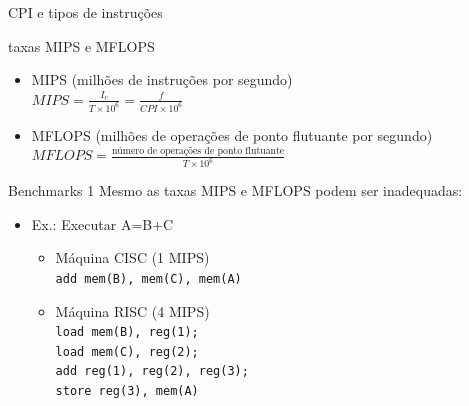 \begin{slide}{CPI e tipos de instruções}
\begin{center}
\end{center} 
\end{slide}

\begin{slide}{taxas MIPS e MFLOPS}
\begin{itemize}
   \item MIPS (milhões de instruções por segundo)\\ $MIPS = \frac{I_c}{T\times 10^6} = \frac{f}{CPI\times 10^6}$
   \item MFLOPS (milhões de operações de ponto flutuante por segundo)\\
   $MFLOPS = \frac{\text{número de operações de ponto flutuante}}{T\times 10^6}$
\end{itemize} 
\end{slide}

\begin{slide}{Benchmarks 1}
Mesmo as taxas MIPS e MFLOPS podem ser inadequadas:\\
\begin{itemize}
 \item Ex.: Executar A=B+C\\
\begin{itemize}
   \item Máquina CISC (1 MIPS)\\
   \tt{add mem(B), mem(C), mem(A)}
   
   \item Máquina RISC (4 MIPS)\\
   \tt{load mem(B), reg(1);\\
       load mem(C), reg(2);\\
       add  reg(1), reg(2), reg(3);\\
       store reg(3), mem(A)}
\end{itemize}
\end{itemize}
\end{slide}

